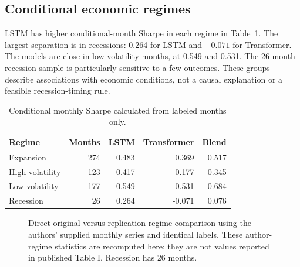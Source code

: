 \documentclass[11pt]{article}
\begin{document}
\clearpage\subsection{Conditional economic regimes}
LSTM has higher conditional-month Sharpe in each regime in Table~\ref{tab:regime}. The largest separation is in recessions: 0.264 for LSTM and $-0.071$ for Transformer. The models are close in low-volatility months, at 0.549 and 0.531. The 26-month recession sample is particularly sensitive to a few outcomes. These groups describe associations with economic conditions, not a causal explanation or a feasible recession-timing rule.
\begin{table}[htbp]\centering\small
\caption{Conditional monthly Sharpe calculated from labeled months only.}\label{tab:regime}
\begin{tabular}{lrrrr}
\toprule
Regime & Months & LSTM & Transformer & Blend \\
\midrule
Expansion & 274 & 0.483 & 0.369 & 0.517 \\
High volatility & 123 & 0.417 & 0.177 & 0.345 \\
Low volatility & 177 & 0.549 & 0.531 & 0.684 \\
Recession & 26 & 0.264 & -0.071 & 0.076 \\
\bottomrule\end{tabular}\end{table}


\begin{figure}[htbp]\centering{}\caption{Direct original-versus-replication regime comparison using the authors' supplied monthly series and identical labels. These author-regime statistics are recomputed here; they are not values reported in published Table I. Recession has 26 months.}\label{fig:regimes}\end{figure}
\end{document}
